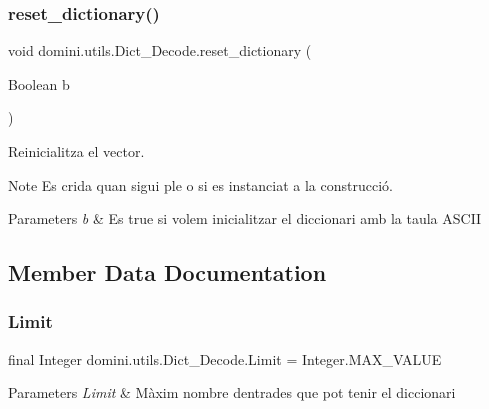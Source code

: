 \subsubsection{\texorpdfstring{reset\+\_\+dictionary()}{reset\_dictionary()}}
{\footnotesize\ttfamily void domini.\+utils.\+Dict\+\_\+\+Decode.\+reset\+\_\+dictionary (\begin{DoxyParamCaption}\item[{Boolean}]{b }\end{DoxyParamCaption})\hspace{0.3cm}{\ttfamily [inline]}}



Reinicialitza el vector. 

\begin{DoxyNote}{Note}
Es crida quan sigui ple o si es instanciat a la construcció. 
\end{DoxyNote}

\begin{DoxyParams}{Parameters}
{\em b} & Es true si volem inicialitzar el diccionari amb la taula A\+S\+C\+II \\
\hline
\end{DoxyParams}


\subsection{Member Data Documentation}
\mbox{\label{classdomini_1_1utils_1_1Dict__Decode_a10fd6693de70b9091942496b35324c5a}} 
\subsubsection{\texorpdfstring{Limit}{Limit}}
{\footnotesize\ttfamily final Integer domini.\+utils.\+Dict\+\_\+\+Decode.\+Limit = Integer.\+M\+A\+X\+\_\+\+V\+A\+L\+UE\hspace{0.3cm}{\ttfamily [package]}}


\begin{DoxyParams}{Parameters}
{\em Limit} & Màxim nombre d\textquotesingle{}entrades que pot tenir el diccionari \\
\hline
\end{DoxyParams}
\mbox{\label{classdomini_1_1utils_1_1Dict__Decode_a351bb8836b391e5e21ebc9cc1943a22d}} 
